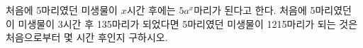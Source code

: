 처음에 5마리였던 미생물이 $x$시간 후에는 $5a^x$마리가 된다고 한다. 처음에 5마리였던 이 미생물이 3시간 후 135마리가 되었다면 5마리였던 미생물이 1215마리가 되는 것은 처음으로부터 몇 시간 후인지 구하시오. 

